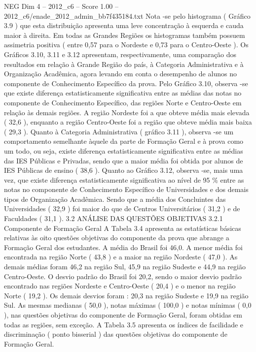 \begin{textsample}{NEG Dim 4 – 2012\_c6 – Score 1.00 – 2012\_c6/enade\_2012\_admin\_bb7f435184.txt}
Nota -se pelo histograma ( Gráfico 3.9 ) que esta distribuição apresenta uma leve concentração à esquerda e cauda maior à direita.
Em todas as Grandes Regiões os histogramas também possuem assimetria positiva ( entre 0,57 para o Nordeste e 0,73 para o Centro-Oeste ).
Os Gráficos 3.10, 3.11 e 3.12 apresentam, respectivamente, uma comparação dos resultados em relação à Grande Região do país, à Categoria Administrativa e à Organização Acadêmica, agora levando em conta o desempenho de alunos no componente de Conhecimento Específico da prova.
Pelo Gráfico 3.10, observa -se que existe diferença estatisticamente significativa entre as médias das notas no componente de Conhecimento Específico, das regiões Norte e Centro-Oeste em relação às demais regiões.
A região Nordeste foi a que obteve média mais elevada ( 32,6 ), enquanto a região Centro-Oeste foi a região que obteve média mais baixa ( 29,3 ).
Quanto à Categoria Administrativa ( gráfico 3.11 ), observa -se um comportamento semelhante àquele da parte de Formação Geral e à prova como um todo, ou seja, existe diferença estatisticamente significativa entre as médias das IES Públicas e Privadas, sendo que a maior média foi obtida por alunos de IES Públicas de ensino ( 38,6 ).
Quanto ao Gráfico 3.12, observa -se, mais uma vez, que existe diferença estatisticamente significativa ao nível de 95 \% entre as notas no componente de Conhecimento Específico de Universidades e dos demais tipos de Organização Acadêmica.
Sendo que a média dos Concluintes das Universidades ( 32,9 ) foi maior do que de Centros Universitários ( 31,2 ) e de Faculdades ( 31,1 ). 3.2 ANÁLISE DAS QUESTÕES OBJETIVAS 3.2.1 Componente de Formação Geral A Tabela 3.4 apresenta as estatísticas básicas relativas às oito questões objetivas do componente da prova que abrange a Formação Geral dos estudantes.
A média do Brasil foi 46,0.
A menor média foi encontrada na região Norte ( 43,8 ) e a maior na região Nordeste ( 47,0 ).
As demais médias foram 46,2 na região Sul, 45,9 na região Sudeste e 44,9 na região Centro-Oeste.
O desvio padrão do Brasil foi 20,2, sendo o maior desvio padrão encontrado nas regiões Nordeste e Centro-Oeste ( 20,4 ) e o menor na região Norte ( 19,2 ).
Os demais desvios foram : 20,3 na região Sudeste e 19,9 na região Sul.
As mesmas medianas ( 50,0 ), notas máximas ( 100,0 ) e notas mínimas ( 0,0 ), nas questões objetivas do componente de Formação Geral, foram obtidas em todas as regiões, sem exceção.
A Tabela 3.5 apresenta os índices de facilidade e discriminação ( ponto bisserial ) das questões objetivas do componente de Formação Geral.

\end{textsample}
